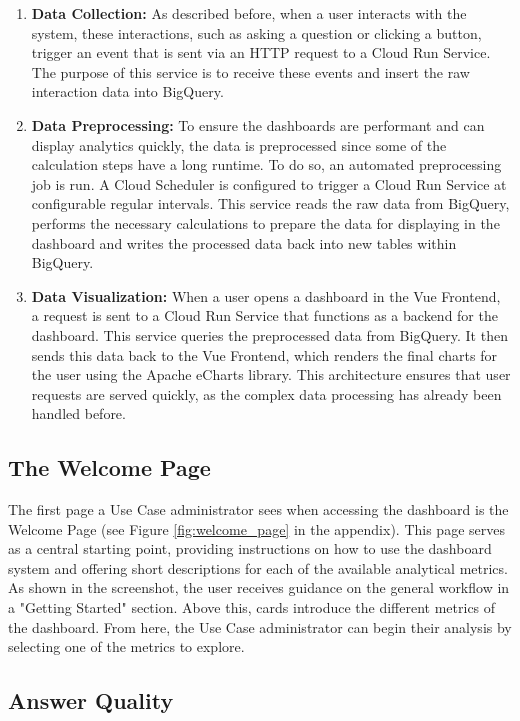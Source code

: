 \documentclass[
	english,
	ruledheaders=section,%
	class=report,%
	thesis={type=bachelor},%
	accentcolor=1b,%
	custommargins=true,%
	marginpar=false,%
	parskip=half-,%
	fontsize=11pt,%
	DIV=14,
]{tudapub}
\begin{document}
\begin{enumerate}
    \item \textbf{Data Collection:} As described before, when a user interacts with the system, these interactions, such as asking a question or clicking a button, trigger an event that is sent via an HTTP request to a Cloud Run Service. The purpose of this service is to receive these events and insert the raw interaction data into BigQuery.

    \item \textbf{Data Preprocessing:} To ensure the dashboards are performant and can display analytics quickly, the data is preprocessed since some of the calculation steps have a long runtime. To do so, an automated preprocessing job is run. A Cloud Scheduler \parencite{googlecloudscheduler} is configured to trigger a Cloud Run Service at configurable regular intervals. This service reads the raw data from BigQuery, performs the necessary calculations to prepare the data for displaying in the dashboard and writes the processed data back into new tables within BigQuery.

    \item \textbf{Data Visualization:} When a user opens a dashboard in the Vue Frontend, a request is sent to a Cloud Run Service that functions as a backend for the dashboard. This service queries the preprocessed data from BigQuery. It then sends this data back to the Vue Frontend, which renders the final charts for the user using the Apache eCharts \parencite{apache_echarts} library. This architecture ensures that user requests are served quickly, as the complex data processing has already been handled before.
\end{enumerate}
\subsection{The Welcome Page}
The first page a Use Case administrator sees when accessing the dashboard is the Welcome Page (see Figure \ref{fig:welcome_page} in the appendix). This page serves as a central starting point, providing instructions on how to use the dashboard system and offering short descriptions for each of the available analytical metrics. As shown in the screenshot, the user receives guidance on the general workflow in a "Getting Started" section. Above this, cards introduce the different metrics of the dashboard. From here, the Use Case administrator can begin their analysis by selecting one of the metrics to explore.
\subsection{Answer Quality}
\end{document}
